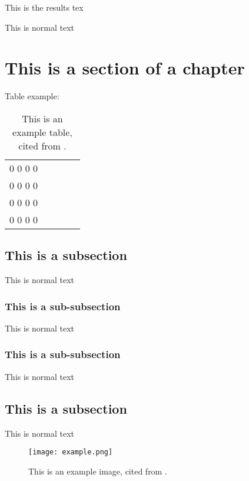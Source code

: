 \documentclass[../uniLu_template.tex]{subfiles}
\begin{document}
This is the results tex 

This is normal text
\section{This is a section of a chapter}

Table example:
\begin{table}[h]
\caption[Example table]{This is an example table, cited from \cite{example_article}.}
\centering
\begin{tabular}{lllll}
 0  0  0  0  \\
 0  0  0  0  \\
 0  0  0  0  \\
 0  0  0  0 
\end{tabular}
\end{table}
\label{example_table}

\subsection{This is a subsection}
This is normal text
\subsubsection{This is a sub-subsection}
This is normal text
\subsubsection{This is a sub-subsection}
This is normal text
\subsection{This is a subsection}
This is normal text
\begin{figure}[h]
\texttt{[image: example.png]}
\caption[Example image]{This is an example image, cited from \cite{example_article}.}
\label{example_label}
\centering
\end{figure}
\end{document}
